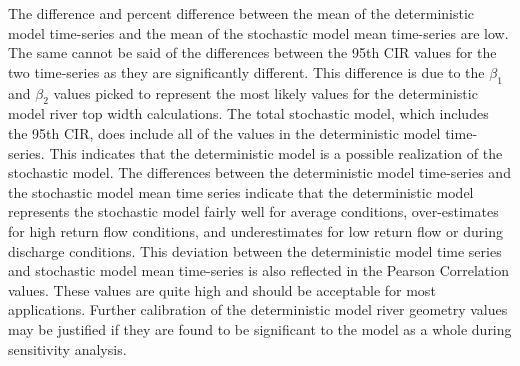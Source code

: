\begin{linenumbers}
\subtabletop
\begin{table}[htbp]
	\centering
	\caption[USR deterministic and stochastic model time-series total estimated unaccounted for non-point water gains and losses numeric results.]{USR deterministic and stochastic model time-series total estimated unaccounted for non-point water gains and losses numeric results.  Total daily contribution is presented in units of \si{\cubic\meter\per\second\per\kilo\meter} (\si{\cfs\per\mile}).}
	\label{tab:reachWater_US}
	
\end{table}
\tablevspace
\begin{table}[htbp]
	\centering
	\caption[DSR deterministic and stochastic model time-series total estimated unaccounted for non-point water gains and losses numeric results.]{DSR deterministic and stochastic model time-series total estimated unaccounted for non-point water gains and losses numeric results.  Total daily contribution is presented in units of \si{\cubic\meter\per\second\per\kilo\meter} (\si{\cfs\per\mile}).}
	\label{tab:reachWater_DS}
	
\end{table}

The difference and percent difference between the mean of the deterministic model time-series and the mean of the stochastic model mean time-series are low.  The same cannot be said of the differences between the 95th CIR values for the two time-series as they are significantly different.  This difference is due to the $ \beta_1 $ and $ \beta_2 $ values picked to represent the most likely values for the deterministic model river top width calculations.  The total stochastic model, which includes the 95th CIR, does include all of the values in the deterministic model time-series.  This indicates that the deterministic model is a possible realization of the stochastic model.  The differences between the deterministic model time-series and the stochastic model mean time series indicate that the deterministic model represents the stochastic model fairly well for average conditions, over-estimates for high return flow conditions, and underestimates for low return flow or during discharge conditions.  This deviation between the deterministic model time series and stochastic model mean time-series is also reflected in the Pearson Correlation values.  These values are quite high and should be acceptable for most applications.  Further calibration of the deterministic model river geometry values may be justified if they are found to be significant to the model as a whole during sensitivity analysis.


\end{linenumbers}
